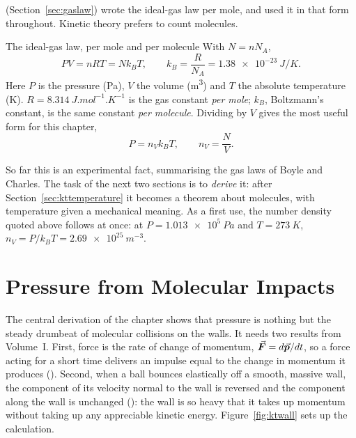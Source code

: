  (Section~\ref{sec:gaslaw}) wrote the ideal-gas law per mole, and  used it in that form throughout. Kinetic theory prefers to count molecules.

\begin{keybox}{The ideal-gas law, per mole and per molecule}
With $N=nN_A$,
\[
PV = nRT = Nk_BT, \qquad k_B = \frac{R}{N_A} = \SI{1.38e-23}{J/K}.
\]
Here $P$ is the pressure (\si{Pa}), $V$ the volume (\si{m^3}) and $T$ the absolute temperature (\si{K}).
$R=\SI{8.314}{J.mol^{-1}.K^{-1}}$ is the gas constant \emph{per mole}; $k_B$, Boltzmann's constant, is
the same constant \emph{per molecule}. Dividing by $V$ gives the most useful form for this chapter,
\[
P = n_Vk_BT, \qquad n_V=\frac{N}{V}.
\]
\end{keybox}

So far this is an experimental fact, summarising the gas laws of Boyle and Charles. The task of the next
two sections is to \emph{derive} it: after Section~\ref{sec:kttemperature} it becomes a theorem about
molecules, with temperature given a mechanical meaning. As a first use, the number density quoted above
follows at once: at $P=\SI{1.013e5}{Pa}$ and $T=\SI{273}{K}$,
$n_V=P/k_BT=\SI{2.69e25}{m^{-3}}$.


\section{Pressure from Molecular Impacts}\label{sec:ktpressure}

The central derivation of the chapter shows that pressure is nothing but the steady drumbeat of molecular
collisions on the walls. It needs two results from Volume~I. First, force is the rate of change of
momentum, $\vec{\bm{F}}=d\vec{\bm{p}}/dt$, so a force acting for a short time delivers an impulse equal to the change in
momentum it produces (). Second, when a ball bounces elastically off a smooth, massive
wall, the component of its velocity normal to the wall is reversed and the component along the wall is
unchanged (): the wall is so heavy that it takes up momentum without taking up any
appreciable kinetic energy. Figure~\ref{fig:ktwall} sets up the calculation.

